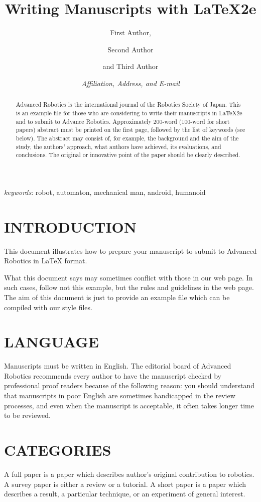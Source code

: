 \documentclass{arsubmit}
\title{Writing Manuscripts with LaTeX2e}
\author{First Author, \and Second Author \and and Third Author}
\date{\small \it{Affiliation, Address, and E-mail}}
\begin{document}
\maketitle
\begin{abstract}
Advanced Robotics is the international journal of the Robotics Society
of Japan.
This is an example file for those who are considering
to write their manuscripts in LaTeX2e and to submit to Advance Robotics.
Approximately 200-word (100-word for short papers) abstract must be 
printed on the first page, followed by the list of keywords (see below).  
The abstract may consist of, for example, the background and the 
aim of the study, the authors' approach, what authors have achieved, 
its evaluations,  and conclusions.  
The original or innovative point of the paper
should be clearly described.
\end{abstract}
{\it keywords}: robot, automaton, mechanical man, android, humanoid

\section{INTRODUCTION}
\label{sec:introduction}

This document illustrates how to prepare your manuscript to submit
to Advanced Robotics in LaTeX format.

What this document says may sometimes conflict with those in our web 
page.  In such cases, follow not this example, but the rules and 
guidelines in the web page.
The aim of this document is just to provide an example file which
can be compiled with our style files.

\section{LANGUAGE}
\label{sec:Language}

Manuscripts must be written in English.  
The editorial board of Advanced
Robotics recommends every author to have the manuscript checked by
professional proof readers because of the following reason:
you should understand
that manuscripts in poor English are sometimes handicapped in the
review processes, and even when the manuscript is acceptable, 
it often takes longer time to be reviewed.

\section{CATEGORIES}
\label{sec:Categories}
A full paper is a paper which describes author's original contribution
to robotics.  
A survey paper is either a review or a tutorial.
A short paper is a paper which describes a result, a particular technique,
or an experiment of general interest.
\end{document}
